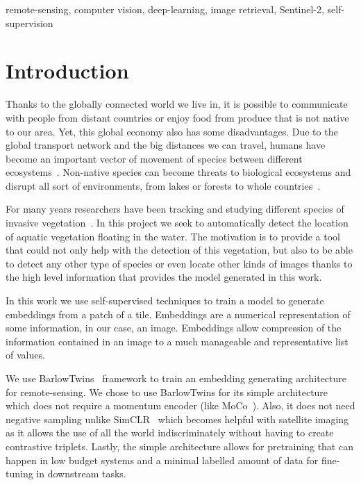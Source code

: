 \documentclass[conference]{IEEEtran}
\begin{document}
    \begin{IEEEkeywords}
        remote-sensing, computer vision, deep-learning, image retrieval, Sentinel-2, self-supervision
    \end{IEEEkeywords}


    \section{Introduction}
    Thanks to the globally connected world we live in, it is possible to communicate with people from distant countries or
    enjoy food from produce that is not native to our area.
    Yet, this global economy also has some disadvantages.
    Due to the global transport network and the big distances we can travel, humans have become an important vector of movement of species
    between different ecosystems~\cite{invasive_species}.
    Non-native species can become threats to biological ecosystems and disrupt all sort of environments,
    from lakes or forests to whole countries~\cite{bhlitem21490}.

    For many years researchers have been tracking and studying different species of invasive vegetation~\cite{huang2009applications, aguir2013, donyana1, donyana2}.
    In this project we seek to automatically detect the location of aquatic vegetation floating in the water.
    The motivation is to provide a tool that could not only help with the detection of this vegetation, but also to be able to detect
    any other type of species or even locate other kinds of images thanks to the high level information that provides the model generated in this work.

    In this work we use self-supervised techniques to train a model to generate embeddings from a patch of a tile.
    Embeddings are a numerical representation of some information, in our case, an image.
    Embeddings allow compression of the information contained in an image to a much manageable and representative list of values.

    We use BarlowTwins~\cite{barlowtwins} framework to train an embedding generating architecture for remote-sensing.
    We chose to use BarlowTwins for its simple architecture which does not require a momentum encoder (like MoCo~\cite{he2020momentum, grill2020bootstrap}).
    Also, it does not need negative sampling unlike SimCLR~\cite{chen2020simple} which becomes helpful with satellite imaging as it allows the use
    of all the world indiscriminately without having to create contrastive triplets.
    Lastly, the simple architecture allows for pretraining that can happen in low budget systems and a minimal labelled amount of data for fine-tuning in downstream tasks.
\end{document}
